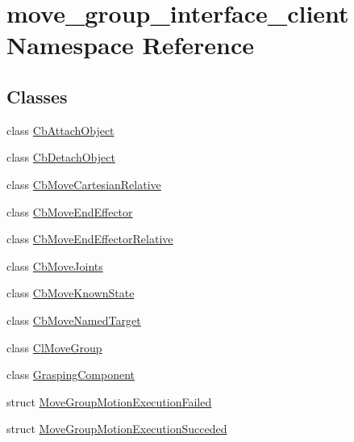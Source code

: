 \hypertarget{namespacemove__group__interface__client}{}\section{move\+\_\+group\+\_\+interface\+\_\+client Namespace Reference}
\label{namespacemove__group__interface__client}
\subsection*{Classes}
\begin{DoxyCompactItemize}
\item 
class \hyperlink{classmove__group__interface__client_1_1CbAttachObject}{Cb\+Attach\+Object}
\item 
class \hyperlink{classmove__group__interface__client_1_1CbDetachObject}{Cb\+Detach\+Object}
\item 
class \hyperlink{classmove__group__interface__client_1_1CbMoveCartesianRelative}{Cb\+Move\+Cartesian\+Relative}
\item 
class \hyperlink{classmove__group__interface__client_1_1CbMoveEndEffector}{Cb\+Move\+End\+Effector}
\item 
class \hyperlink{classmove__group__interface__client_1_1CbMoveEndEffectorRelative}{Cb\+Move\+End\+Effector\+Relative}
\item 
class \hyperlink{classmove__group__interface__client_1_1CbMoveJoints}{Cb\+Move\+Joints}
\item 
class \hyperlink{classmove__group__interface__client_1_1CbMoveKnownState}{Cb\+Move\+Known\+State}
\item 
class \hyperlink{classmove__group__interface__client_1_1CbMoveNamedTarget}{Cb\+Move\+Named\+Target}
\item 
class \hyperlink{classmove__group__interface__client_1_1ClMoveGroup}{Cl\+Move\+Group}
\item 
class \hyperlink{classmove__group__interface__client_1_1GraspingComponent}{Grasping\+Component}
\item 
struct \hyperlink{structmove__group__interface__client_1_1MoveGroupMotionExecutionFailed}{Move\+Group\+Motion\+Execution\+Failed}
\item 
struct \hyperlink{structmove__group__interface__client_1_1MoveGroupMotionExecutionSucceded}{Move\+Group\+Motion\+Execution\+Succeded}
\end{DoxyCompactItemize}
